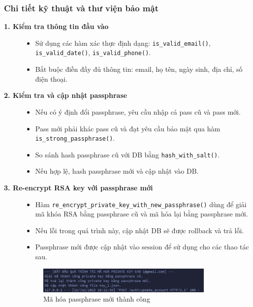 \subsubsection*{Chi tiết kỹ thuật và thư viện bảo mật}
\begin{description}

    \item[\textbf{1. Kiểm tra thông tin đầu vào}]
    \begin{itemize}
        \item Sử dụng các hàm xác thực định dạng: \texttt{is\_valid\_email()}, \texttt{is\_valid\_date()}, \texttt{is\_valid\_phone()}.
        \item Bắt buộc điền đầy đủ thông tin: email, họ tên, ngày sinh, địa chỉ, số điện thoại.
    \end{itemize}

    \item[\textbf{2. Kiểm tra và cập nhật passphrase}]
    \begin{itemize}
        \item Nếu có ý định đổi passphrase, yêu cầu nhập cả pass cũ và pass mới.
        \item Pass mới phải khác pass cũ và đạt yêu cầu bảo mật qua hàm \texttt{is\_strong\_passphrase()}.
        \item So sánh hash passphrase cũ với DB bằng \texttt{hash\_with\_salt()}.
        \item Nếu hợp lệ, hash passphrase mới và cập nhật vào DB.
    \end{itemize}

    \item[\textbf{3. Re-encrypt RSA key với passphrase mới}]
    \begin{itemize}
        \item Hàm \texttt{re\_encrypt\_private\_key\_with\_new\_passphrase()} dùng để giải mã khóa RSA bằng passphrase cũ và mã hóa lại bằng passphrase mới.
        \item Nếu lỗi trong quá trình này, cập nhật DB sẽ được rollback và trả lỗi.
        \item Passphrase mới được cập nhật vào session để sử dụng cho các thao tác sau.
    \end{itemize}
    \begin{figure}[H]
        \centering
        \includegraphics[width=0.85\textwidth]{img/5_update/5_update_re_enc.png}
        \caption{Mã hóa passphrase mới thành công}
    \end{figure}


\end{description}
